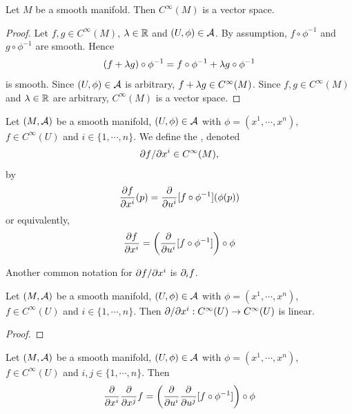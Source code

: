 \documentclass{book}
\begin{document}
\begin{ex}  
	Let $M$ be a smooth manifold. Then $C^{\infty}(M)$ is a vector space.
\end{ex}

\begin{proof}
	Let $f,g \in C^{\infty}(M)$, $\lambda \in \mathbb{R}$ and $(U, \phi) \in \mathcal{A}$. By assumption, $f \circ \phi^{-1}$ and $g \circ \phi^{-1}$ are smooth. Hence 
	$$(f + \lambda g) \circ \phi^{-1} = f \circ \phi^{-1} + \lambda g \circ \phi^{-1} $$
	is smooth. Since $(U, \phi) \in \mathcal{A}$ is arbitrary, $f + \lambda g \in C^{\infty}(M)$. Since $f,g \in C^{\infty}(M)$ and $\lambda \in \mathbb{R}$ are arbitrary, $C^{\infty}(M)$ is a vector space.
\end{proof}

\begin{defn}  
	Let $(M, \mathcal{A})$ be a smooth manifold, $(U, \phi) \in \mathcal{A}$ with $\phi = (x^1, \cdots, x^n)$, $f \in C^{\infty}(U)$ and $i \in \{1, \cdots, n\}$. We define the , denoted 
	$$\partial f / \partial x^i \in C^{\infty}(M),$$ 
	by
	\begin{equation*}
		\frac{\partial f}{\partial x^i}(p) = {\frac{\partial}{\partial u^i}[f \circ \phi^{-1}] }( \phi(p)) 
	\end{equation*}
	or equivalently,
	\begin{equation*}
		\frac{\partial f}{\partial x^i} = \bigg({\frac{\partial}{\partial u^i}[f \circ \phi^{-1}] \bigg) \circ \phi }
	\end{equation*}
\end{defn}

\begin{note}
	Another common notation for $\partial f/\partial x^i$ is $\partial_i f$.
\end{note}

\begin{ex}  
	Let $(M, \mathcal{A})$ be a smooth manifold, $(U, \phi) \in \mathcal{A}$ with $\phi = (x^1, \cdots, x^n)$, $f \in C^{\infty}(U)$ and $i \in \{1, \cdots, n\}$. Then $\partial / \partial x^i:  C^{\infty}(U) \rightarrow C^{\infty}(U)$ is linear.
\end{ex}

\begin{proof}
\end{proof}

\begin{ex}  
	Let $(M, \mathcal{A})$ be a smooth manifold, $(U, \phi) \in \mathcal{A}$ with $\phi = (x^1, \cdots, x^n)$, $f \in C^{\infty}(U)$ and $i,j \in \{1, \cdots, n\}$. Then 
	$$\frac{\partial}{\partial x^i}\frac{\partial}{\partial x^j} f =  \bigg(\frac{\partial}{\partial u^i} \frac{\partial}{\partial u^j}[f \circ \phi^{-1}] \bigg) \circ \phi $$
\end{ex}
\end{document}
